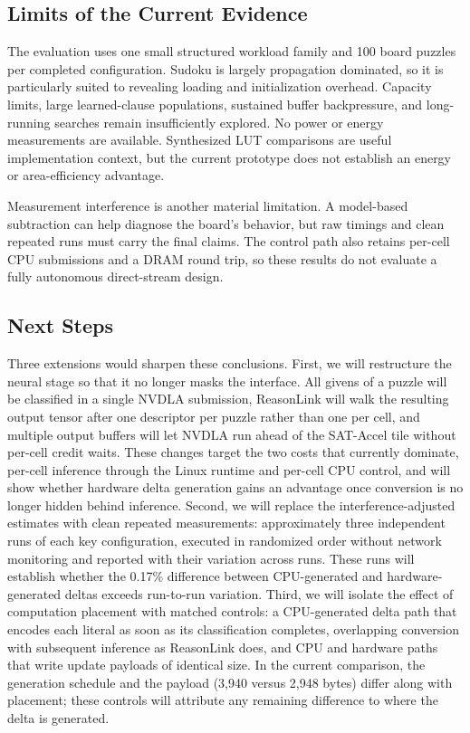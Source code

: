 \subsection{Limits of the Current Evidence}
The evaluation uses one small structured workload family and 100 board puzzles per completed configuration. Sudoku is largely propagation dominated, so it is particularly suited to revealing loading and initialization overhead. Capacity limits, large learned-clause populations, sustained buffer backpressure, and long-running searches remain insufficiently explored. No power or energy measurements are available. Synthesized LUT comparisons are useful implementation context, but the current prototype does not establish an energy or area-efficiency advantage.

Measurement interference is another material limitation. A model-based subtraction can help diagnose the board's behavior, but raw timings and clean repeated runs must carry the final claims. The control path also retains per-cell CPU submissions and a DRAM round trip, so these results do not evaluate a fully autonomous direct-stream design.

\subsection{Next Steps}
Three extensions would sharpen these conclusions. First, we will restructure the neural stage so that it no longer masks the interface. All givens of a puzzle will be classified in a single NVDLA submission, ReasonLink will walk the resulting output tensor after one descriptor per puzzle rather than one per cell, and multiple output buffers will let NVDLA run ahead of the SAT-Accel tile without per-cell credit waits. These changes target the two costs that currently dominate, per-cell inference through the Linux runtime and per-cell CPU control, and will show whether hardware delta generation gains an advantage once conversion is no longer hidden behind inference. Second, we will replace the interference-adjusted estimates with clean repeated measurements: approximately three independent runs of each key configuration, executed in randomized order without network monitoring and reported with their variation across runs. These runs will establish whether the 0.17\% difference between CPU-generated and hardware-generated deltas exceeds run-to-run variation. Third, we will isolate the effect of computation placement with matched controls: a CPU-generated delta path that encodes each literal as soon as its classification completes, overlapping conversion with subsequent inference as ReasonLink does, and CPU and hardware paths that write update payloads of identical size. In the current comparison, the generation schedule and the payload (3,940 versus 2,948 bytes) differ along with placement; these controls will attribute any remaining difference to where the delta is generated.

